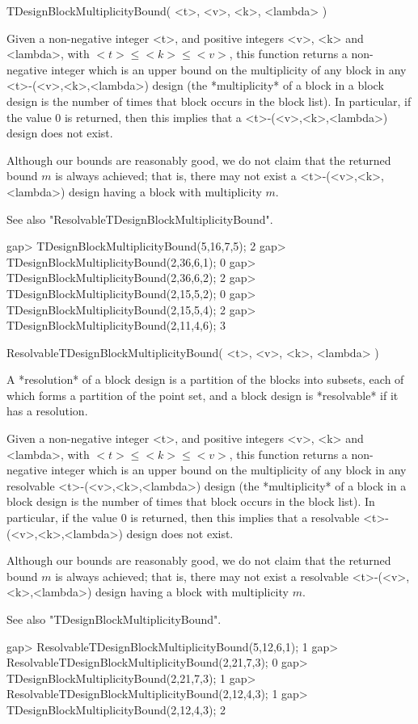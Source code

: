\>TDesignBlockMultiplicityBound( <t>, <v>, <k>, <lambda> )

Given a non-negative integer <t>, and positive integers <v>, <k> and
<lambda>, with $<t>\le <k>\le <v>$, this function returns a non-negative
integer which is an upper bound on the multiplicity of any block in
any <t>-(<v>,<k>,<lambda>) design (the *multiplicity* of a block in
a block design is the number of times that block occurs in the block
list). In particular, if the value $0$ is returned, then this implies
that a <t>-(<v>,<k>,<lambda>) design does not exist.

Although our bounds are reasonably good, we do not claim that the
returned bound $m$ is always achieved; that is, there may not exist a
<t>-(<v>,<k>,<lambda>) design having a block with multiplicity $m$.

See also "ResolvableTDesignBlockMultiplicityBound".

\beginexample
gap> TDesignBlockMultiplicityBound(5,16,7,5);
2
gap> TDesignBlockMultiplicityBound(2,36,6,1);
0
gap> TDesignBlockMultiplicityBound(2,36,6,2);
2
gap> TDesignBlockMultiplicityBound(2,15,5,2);
0
gap> TDesignBlockMultiplicityBound(2,15,5,4);
2
gap> TDesignBlockMultiplicityBound(2,11,4,6);
3
\endexample



\>ResolvableTDesignBlockMultiplicityBound( <t>, <v>, <k>, <lambda> )
 
A *resolution* of a block design is a partition of the blocks into
subsets, each of which forms a partition of the point set, and a block
design is *resolvable* if it has a resolution.

Given a non-negative integer <t>, and positive integers <v>, <k> and
<lambda>, with $<t>\le <k>\le <v>$, this function returns a non-negative
integer which is an upper bound on the multiplicity of any block in any
resolvable <t>-(<v>,<k>,<lambda>) design (the *multiplicity* of a block
in a block design is the number of times that block occurs in the block
list). In particular, if the value $0$ is returned, then this implies
that a resolvable <t>-(<v>,<k>,<lambda>) design does not exist.

Although our bounds are reasonably good, we do not claim that the returned
bound $m$ is always achieved; that is, there may not exist a resolvable
<t>-(<v>,<k>,<lambda>) design having a block with multiplicity $m$.

See also "TDesignBlockMultiplicityBound".

\beginexample
gap> ResolvableTDesignBlockMultiplicityBound(5,12,6,1);
1
gap> ResolvableTDesignBlockMultiplicityBound(2,21,7,3);
0
gap> TDesignBlockMultiplicityBound(2,21,7,3);          
1
gap> ResolvableTDesignBlockMultiplicityBound(2,12,4,3);
1
gap> TDesignBlockMultiplicityBound(2,12,4,3);          
2
\endexample

